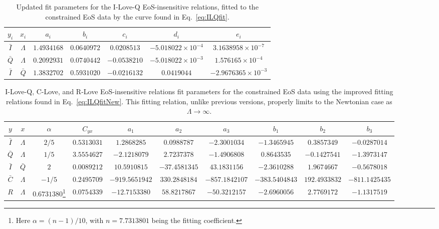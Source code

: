 \documentclass[prd,twocolumn,nofootinbib,superscriptaddress,amsmath,amssymb]{revtex4-1}
\begin{document}
\begin{table*}
\centering
\caption{
Updated fit parameters for the I-Love-Q EoS-insensitive relations, fitted to the constrained EoS data by the curve found in Eq.~\ref{eq:ILQfit}.
}\label{tab:ILQfit}
\begin{tabular}{ c  c | c c c c c } 
 \hline
 \hline
 $y_i$ & $x_i$ & $a_i$ & $b_i$ & $c_i$ & $d_i$ & $e_i$ \\
 \hline
 $\bar{I}$ & $\Lambda$ & $1.4934168$ & $0.0640972$ & $0.0208513$ & $-5.018022 \times 10^{-4}$ & $3.1638958 \times 10^{-7}$ \\
 $\bar{Q}$ & $\Lambda$ & $0.2092931$ & $0.0740442$ & $-0.0538210$ & $-5.018022 \times 10^{-3}$ & $1.576165 \times 10^{-4}$ \\ 
  $\bar{I}$ & $\bar{Q}$ & $1.3832702$ & $0.5931020$ & $-0.0216132$ & $0.0419044$ & $-2.9676365 \times 10^{-3}$ \\
 \hline
 \hline
\end{tabular}
\end{table*}

\begin{table*}
\centering
\caption{
I-Love-Q, C-Love, and R-Love EoS-insensitive relations fit parameters for the constrained EoS data using the improved fitting relations found in Eq.~\ref{eq:ILQfitNew}.
This fitting relation, unlike previous versions, properly limits to the Newtonian case as $\Lambda \rightarrow \infty$.
}\label{tab:ILQfitNew}
\begin{tabular}{ c  c  | c c c c c c c c} 
 \hline
 \hline
 $y$ & $x$ & $\alpha$ & $C_{yx}$ & $a_1$ & $a_2$ & $a_3$ & $b_1$ & $b_2$ & $b_3$ \\
 \hline
 $\bar{I}$ & $\Lambda$ & $2/5$ & $0.5313031$ & $1.2868285$ & $0.0988787$ & $-2.3001034$ & $-1.3465945$ & $0.3857349$ & $-0.0287014$\\
 $\bar{Q}$ & $\Lambda$ & $1/5$ & $3.5554627$ & $-2.1218079$ & $2.7237378$ & $-1.4906808$ & $0.8643535$ & $-0.1427541$ & $-1.3973147$\\
 $\bar{I}$ & $\bar{Q}$ & $2$ & $0.0089212$ & $10.5910815$ & $-37.4581345$ & $43.1831156$ & $-2.3610288$ & $1.9674667$ & $-0.5678018$\\
 $\bar{C}$ & $\Lambda$ & $-1/5$ & $0.2495709$ & $-919.5651942$ & $330.2848184$ & $-857.1842107$ & $-383.5404843$ & $192.4933832$ & $-811.1425435$\\
 $R$ & $\Lambda$ & $0.6731380$\footnote{Here $\alpha=(n-1)/10$, with $n=7.7313801$ being the fitting coefficient.} & $0.0754339$ & $-12.7153380$ & $58.8217867$ & $-50.3212157$ & $-2.6960056$ & $2.7769172$ & $-1.1317519$\\
\hline
\hline
\end{tabular}
\end{table*}
\end{document}
